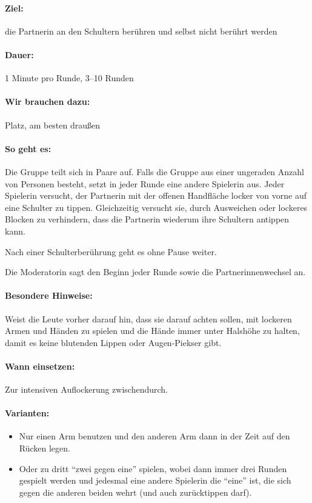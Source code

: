 \paragraph{Ziel:} die Partnerin an den Schultern berühren und selbst nicht berührt werden
\paragraph{Dauer:} 1 Minute pro Runde, 3--10 Runden
\paragraph{Wir brauchen dazu:} Platz, am besten draußen
\paragraph{So geht es:} Die Gruppe teilt sich in Paare auf. Falls die Gruppe aus einer ungeraden Anzahl von Personen besteht, setzt in jeder Runde eine andere Spielerin aus. Jeder Spielerin versucht, der Partnerin mit der offenen Handfläche locker von vorne auf eine Schulter zu tippen. Gleichzeitig versucht sie, durch Ausweichen oder lockeres Blocken zu verhindern, dass die Partnerin wiederum ihre Schultern antippen kann.

Nach einer Schulterberührung geht es ohne Pause weiter.

Die Moderatorin sagt den Beginn jeder Runde sowie die Partnerinnenwechsel an.
\paragraph{Besondere Hinweise:} Weist die Leute vorher darauf hin, dass sie darauf achten sollen, mit lockeren Armen und Händen zu spielen und die Hände immer unter Halshöhe zu halten, damit es keine blutenden Lippen oder Augen-Piekser gibt.
\paragraph{Wann einsetzen:} Zur intensiven Auflockerung zwischendurch.
\paragraph{Varianten:}
\begin{itemize}
  \item Nur einen Arm benutzen und den anderen Arm dann in der Zeit auf den Rücken legen.
  \item Oder zu dritt "`zwei gegen eine"' spielen, wobei dann immer drei Runden gespielt werden und jedesmal eine andere Spielerin die "`eine"' ist, die sich gegen die anderen beiden wehrt (und auch zurücktippen darf).
\end{itemize}


